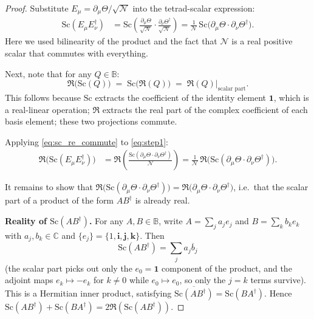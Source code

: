 \documentclass[12pt]{article}
\theoremstyle{definition}
\theoremstyle{remark}
\begin{document}
\begin{proof}
Substitute $E_\mu = \partial_\mu\Theta/\sqrt{\mathcal{N}}$ into the tetrad-scalar expression:
\begin{align}
  \mathrm{Sc}(E_\mu E_\nu^\dagger)
  &= \mathrm{Sc}\!\left(\frac{\partial_\mu\Theta}{\sqrt{\mathcal{N}}}
     \cdot\frac{\partial_\nu\Theta^\dagger}{\sqrt{\mathcal{N}}}\right)
   = \frac{1}{\mathcal{N}}\,\mathrm{Sc}\!\bigl(\partial_\mu\Theta\cdot\partial_\nu\Theta^\dagger\bigr).
  \label{eq:step1}
\end{align}
Here we used bilinearity of the product and the fact that $\mathcal{N}$ is a real positive scalar
that commutes with everything.

Next, note that for any $Q\in\mathbb{B}$:
\begin{equation}
  \Re\!\bigl(\mathrm{Sc}(Q)\bigr) \;=\; \mathrm{Sc}\!\bigl(\Re(Q)\bigr)
  \;=\; \Re(Q)\big|_{\text{scalar part}}.
  \label{eq:sc_re_commute}
\end{equation}
This follows because $\mathrm{Sc}$ extracts the coefficient of the identity element $\mathbf{1}$,
which is a real-linear operation; $\Re$ extracts the real part of the complex coefficient of
each basis element; these two projections commute.

Applying \eqref{eq:sc_re_commute} to \eqref{eq:step1}:
\begin{align}
  \Re\!\bigl(\mathrm{Sc}(E_\mu E_\nu^\dagger)\bigr)
  &= \Re\!\left(\frac{\mathrm{Sc}(\partial_\mu\Theta\cdot\partial_\nu\Theta^\dagger)}{\mathcal{N}}\right)
   = \frac{1}{\mathcal{N}}\,\Re\!\bigl(\mathrm{Sc}(\partial_\mu\Theta\cdot\partial_\nu\Theta^\dagger)\bigr).
  \label{eq:step2}
\end{align}

It remains to show that
$\Re\!\bigl(\mathrm{Sc}(\partial_\mu\Theta\cdot\partial_\nu\Theta^\dagger)\bigr)
 = \Re\!\bigl(\partial_\mu\Theta\cdot\partial_\nu\Theta^\dagger\bigr)$,
i.e.\ that the scalar part of a product of the form $AB^\dagger$ is already real.

\textbf{Reality of $\mathrm{Sc}(AB^\dagger)$.}
For any $A,B\in\mathbb{B}$, write $A = \sum_j a_j e_j$ and $B = \sum_k b_k e_k$
with $a_j,b_k\in\mathbb{C}$ and $\{e_j\} = \{1,\mathbf{i},\mathbf{j},\mathbf{k}\}$.
Then
\[
  \mathrm{Sc}(AB^\dagger) = \sum_j a_j \overline{b}_j
\]
(the scalar part picks out only the $e_0=\mathbf{1}$ component of the product, and
the adjoint maps $e_k\mapsto -e_k$ for $k\neq 0$ while $e_0\mapsto e_0$, so only
the $j=k$ terms survive).  This is a Hermitian inner product, satisfying
$\overline{\mathrm{Sc}(AB^\dagger)} = \mathrm{Sc}(BA^\dagger)$.  Hence
$\mathrm{Sc}(AB^\dagger) + \mathrm{Sc}(BA^\dagger) = 2\Re(\mathrm{Sc}(AB^\dagger))$.


\end{proof}
\end{document}

